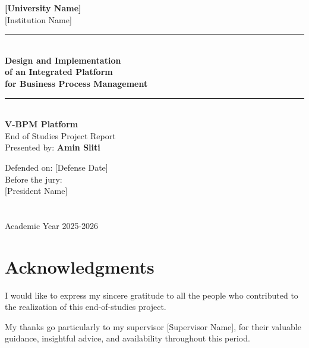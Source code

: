 \begin{titlepage}
\centering
\vspace*{1cm}

{\Large\textbf{[University Name]}}\\[0.2cm]
{\large [Institution Name]}\\[1.5cm]

\rule{\textwidth}{2pt}\\[0.5cm]
{\Huge\textbf{Design and Implementation}}\\[0.3cm]
{\Huge\textbf{of an Integrated Platform}}\\[0.3cm]
{\Huge\textbf{for Business Process Management}}\\[0.5cm]
\rule{\textwidth}{2pt}\\[1.5cm]

{\LARGE\textbf{V-BPM Platform}}\\[1.5cm]

{\large End of Studies Project Report}\\[0.5cm]
{\large Presented by: \textbf{Amin Sliti}}\\[1cm]

\vfill

{\large Defended on: [Defense Date]}\\[0.5cm]
{\large Before the jury:\\[0.2cm]
[President Name]\\
[Reviewer Name]\\
[Supervisor Name]}\\[1cm]

{\large Academic Year 2025-2026}

\end{titlepage}

\chapter*{Acknowledgments}

I would like to express my sincere gratitude to all the people who contributed to the realization of this end-of-studies project.

My thanks go particularly to my supervisor [Supervisor Name], for their valuable guidance, insightful advice, and availability throughout this period.

